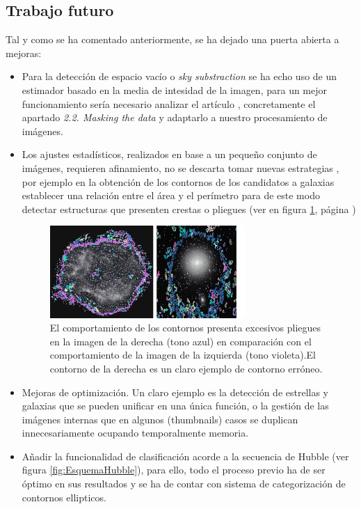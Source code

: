 	\subsection{Trabajo futuro}
	\label{sec:futureWork}
	Tal y como se ha comentado anteriormente, se ha dejado una puerta abierta a mejoras:
	\begin{itemize} 
	\item Para la detección de espacio vacío o \textit{sky substraction} se ha echo uso de un estimador basado en la media de intesidad de la imagen, para un mejor funcionamiento sería necesario analizar el artículo \cite{BlantonSubstraction}, concretamente el apartado \textit{2.2. Masking the data} y adaptarlo a nuestro procesamiento de imágenes.
	\item Los ajustes estadísticos, realizados en base a un pequeño conjunto de imágenes, requieren afinamiento, no se descarta tomar nuevas estrategias \cite{SSDImgPro}, por ejemplo en la obtención de los contornos de los candidatos a galaxias establecer una relación entre el área y el perímetro para de este modo detectar estructuras que presenten crestas o pliegues (ver en figura \ref{fig:MembraneNebulae}, página \pageref{fig:MembraneNebulae})
		\begin{figure}[!htb]
			\centering
			\includegraphics[width=0.7\textwidth]{images/nebulaMembrana2.jpg}
			\caption{\label{fig:MembraneNebulae}{\small El comportamiento de los contornos presenta excesivos pliegues en la imagen de la derecha (tono azul) en comparación con el comportamiento de la imagen de la izquierda (tono violeta).El contorno de la derecha es un claro ejemplo de contorno erróneo.}}
		\end{figure}
	\item Mejoras de optimización. Un claro ejemplo es la detección de estrellas y galaxias que se pueden unificar en una única función, o la gestión de las imágenes internas que en algunos (thumbnails) casos se duplican innecesariamente ocupando temporalmente memoria.
	\item Añadir la funcionalidad de clasificación acorde a la secuencia de Hubble (ver figura \ref{fig:EsquemaHubble}), para ello, todo el proceso previo ha de ser óptimo en sus resultados y se ha de contar con sistema de categorización de contornos ellipticos.

\end{itemize}

